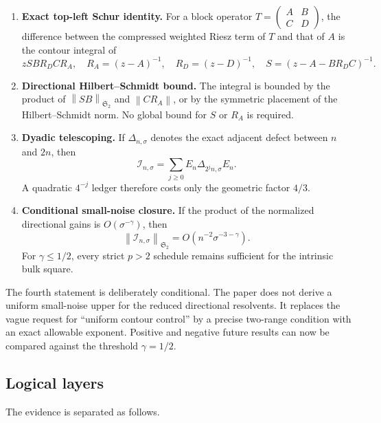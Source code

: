 \documentclass[11pt]{article}
\theoremstyle{definition}
\theoremstyle{remark}
\newcommand{\C}{\mathbb C}
\newcommand{\cI}{\mathcal I}
\newcommand{\HS}{\mathfrak S_2}
\newcommand{\norm}[1]{\left\lVert #1\right\rVert}
\begin{document}
\begin{enumerate}[leftmargin=2.2em]
 \item \textbf{Exact top-left Schur identity.}
 For a block operator
 $T=\left(\begin{smallmatrix}A&B\\C&D\end{smallmatrix}\right)$, the
 difference between the compressed weighted Riesz term of $T$ and that of
 $A$ is the contour integral of
 \[
  zSBR_DCR_A,
  \quad
  R_A=(z-A)^{-1},\quad R_D=(z-D)^{-1},\quad
  S=(z-A-BR_DC)^{-1}.
 \]

 \item \textbf{Directional Hilbert--Schmidt bound.}
 The integral is bounded by the product of
 $\norm{SB}_{\HS}$ and $\norm{CR_A}$, or by the symmetric placement of the
 Hilbert--Schmidt norm.  No global bound for $S$ or $R_A$ is required.

 \item \textbf{Dyadic telescoping.}
 If $\Delta_{n,\sigma}$ denotes the exact adjacent defect between $n$ and
 $2n$, then
 \[
  \cI_{n,\sigma}
  =\sum_{j\ge0}E_n\Delta_{2^jn,\sigma}E_n.
 \]
 A quadratic $4^{-j}$ ledger therefore costs only the geometric factor
 $4/3$.

 \item \textbf{Conditional small-noise closure.}
 If the product of the normalized directional gains is
 $O(\sigma^{-\gamma})$, then
 \[
  \norm{\cI_{n,\sigma}}_{\HS}
  =O(n^{-2}\sigma^{-3-\gamma}).
 \]
 For $\gamma\le1/2$, every strict $p>2$ schedule remains sufficient for the
 intrinsic bulk square.
\end{enumerate}

The fourth statement is deliberately conditional.  The paper does not
derive a uniform small-noise upper for the reduced directional resolvents.
It replaces the vague request for ``uniform contour control'' by a precise
two-range condition with an exact allowable exponent.  Positive and
negative future results can now be compared against the threshold
$\gamma=1/2$.

\subsection*{Logical layers}

The evidence is separated as follows.
\end{document}
